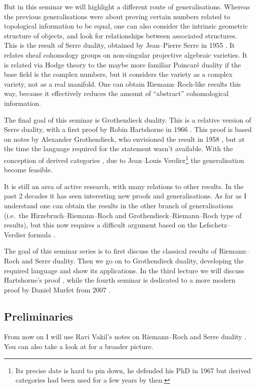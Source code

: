 \documentclass[10pt,a4paper]{article}
\theoremstyle{lecture}
\begin{document}
But in this seminar we will highlight a different route of generalisations. Whereas the previous generalisations were about proving certain numbers related to topological information to be equal, one can also consider the intrinsic geometric structure of objects, and look for relationships between associated structures. This is the result of Serre duality, obtained by Jean--Pierre Serre in 1955 \cite{serre-faisceaux-algebriques-coherents}. It relates sheaf cohomology groups on non-singular projective algebraic varieties. It is related via Hodge theory to the maybe more familiar Poincar\'e duality if the base field is the complex numbers, but it considers the variety as a complex variety, not as a real manifold. One can obtain Riemann--Roch-like results this way, because it effectively reduces the amount of ``abstract'' cohomological information.

The final goal of this seminar is Grothendieck duality. This is a relative version of Serre duality, with a first proof by Robin Hartshorne in 1966 \cite{hartshorne-residues-and-duality}. This proof is based on notes by Alexander Grothendieck, who envisioned the result in 1958 \addreference, but at the time the language required for the statement wasn't available. With the conception of derived categories \cite{verdier-phd}, due to Jean--Louis Verdier\footnote{Its precise date is hard to pin down, he defended his PhD in 1967 but derived categories had been used for a few years by then.} the generalisation become feasible.

It is still an area of active research, with many relations to other results. In the past 2 decades it has seen interesting new proofs and generalisations. As far as I understand one can obtain the results in the other branch of generalisations (i.e.\ the Hirzebruch--Riemann--Roch and Grothendieck--Riemann--Roch type of results), but this now requires a difficult argument based on the Lefschetz--Verdier formula \cite[expos\'e III]{sga5}.

The goal of this seminar series is to first discuss the classical results of Riemann--Roch and Serre duality. Then we go on to Grothendieck duality, developing the required language and show its applications. In the third lecture we will discuss Hartshorne's proof \cite{hartshorne-residues-and-duality}, while the fourth seminar is dedicated to a more modern proof by Daniel Murfet from 2007 \cite{murfet-phd}.


\subsection{Preliminaries}
\label{subsection:preliminaries}
From now on I will use Ravi Vakil's notes on Riemann--Roch and Serre duality \cite{vakil-proof-riemann-roch}. You can also take a look at \cite{vakil-math216} for a broader picture.
\end{document}

